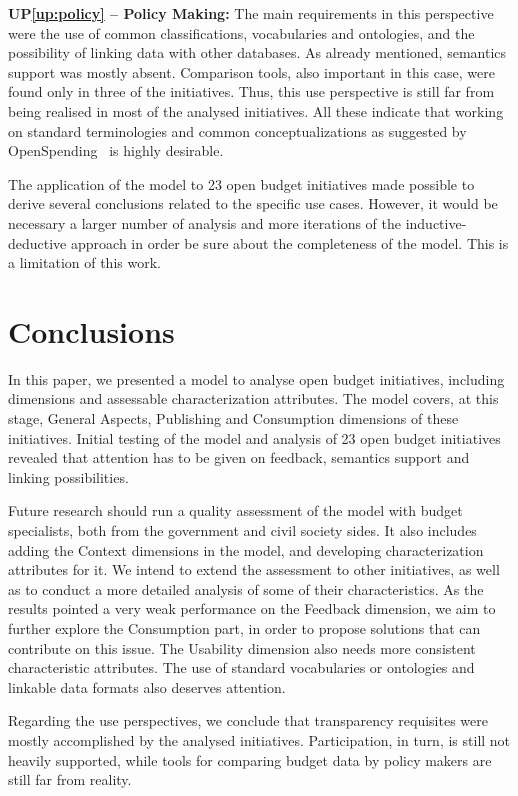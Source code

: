 \noindent \textbf{UP\ref{up:policy} -- Policy Making:}
The main requirements in this perspective were the use of common classifications, vocabularies and ontologies, and the possibility of linking data with other databases.
As already mentioned, semantics support was mostly absent. Comparison tools, also important in this case, were found only in three of the initiatives. 
Thus, this use perspective is still far from being realised in most of the analysed initiatives. 
All these indicate that working on standard terminologies and common conceptualizations as suggested by OpenSpending~\cite{OpenSpending} is highly desirable.

The application of the model to 23 open budget initiatives made possible to derive several conclusions related to the specific use cases.
However, it would be necessary a larger number of analysis and more iterations of the inductive-deductive approach in order be sure about the completeness of the model.
This is a limitation of this work.

\section{Conclusions}
\label{sec:conclusions} 
In this paper, we presented a model to analyse open budget initiatives, including dimensions and assessable characterization attributes. 
The model covers, at this stage, General Aspects, Publishing and Consumption dimensions of these initiatives. 
Initial testing of the model and analysis of 23 open budget initiatives revealed that attention has to be given on feedback, semantics support and linking possibilities.

Future research should run a quality assessment of the model with budget specialists, both from the government and civil society sides.
It also includes adding the Context dimensions in the model, and developing characterization attributes for it. 
We intend to extend the assessment to other initiatives, as well as to conduct a more detailed analysis of some of their characteristics.
As the results pointed a very weak performance on the Feedback dimension, we aim to further explore the Consumption part, in order to propose solutions that can contribute on this issue. 
The Usability dimension also needs more consistent characteristic attributes.
The use of standard vocabularies or ontologies and linkable data formats also deserves attention.

Regarding the use perspectives, we conclude that transparency requisites were mostly accomplished by the analysed initiatives.
Participation, in turn, is still not heavily supported, while tools for comparing budget data by policy makers are still far from reality.

